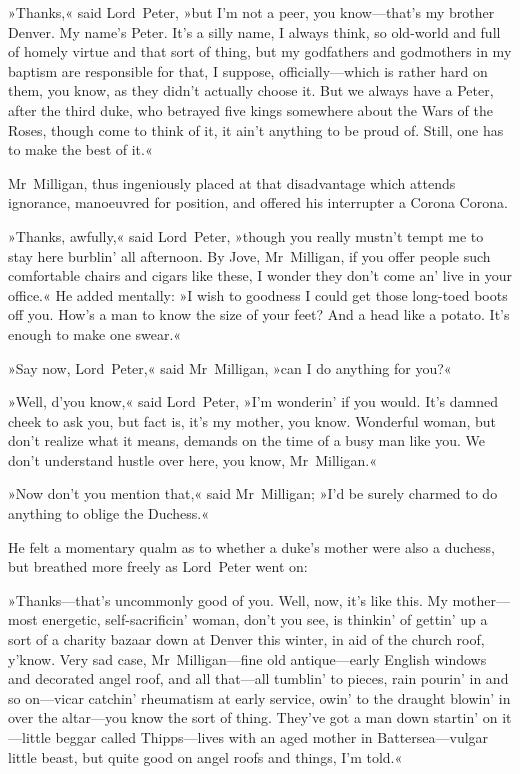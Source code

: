 »Thanks,« said Lord~Peter, »but I'm not a peer, you know—that's my brother Denver. My name's Peter. It's a silly name, I always think, so old-world and full of homely virtue and that sort of thing, but my godfathers and godmothers in my baptism are responsible for that, I suppose, officially—which is rather hard on them, you know, as they didn't actually choose it. But we always have a Peter, after the third duke, who betrayed five kings somewhere about the Wars of the Roses, though come to think of it, it ain't anything to be proud of. Still, one has to make the best of it.«

Mr~Milligan, thus ingeniously placed at that disadvantage which attends ignorance, manoeuvred for position, and offered his interrupter a Corona Corona.

»Thanks, awfully,« said Lord~Peter, »though you really mustn't tempt me to stay here burblin' all afternoon. By Jove, Mr~Milligan, if you offer people such comfortable chairs and cigars like these, I wonder they don't come an' live in your office.« He added mentally: »I wish to goodness I could get those long-toed boots off you. How's a man to know the size of your feet? And a head like a potato. It's enough to make one swear.«

»Say now, Lord~Peter,« said Mr~Milligan, »can I do anything for you?«

»Well, d'you know,« said Lord~Peter, »I'm wonderin' if you would. It's damned cheek to ask you, but fact is, it's my mother, you know. Wonderful woman, but don't realize what it means, demands on the time of a busy man like you. We don't understand hustle over here, you know, Mr~Milligan.«

»Now don't you mention that,« said Mr~Milligan; »I'd be surely charmed to do anything to oblige the Duchess.«

He felt a momentary qualm as to whether a duke's mother were also a duchess, but breathed more freely as Lord~Peter went on:

»Thanks—that's uncommonly good of you. Well, now, it's like this. My mother—most energetic, self-sacrificin' woman, don't you see, is thinkin' of gettin' up a sort of a charity bazaar down at Denver this winter, in aid of the church roof, y'know. Very sad case, Mr~Milligan—fine old antique—early English windows and decorated angel roof, and all that—all tumblin' to pieces, rain pourin' in and so on—vicar catchin' rheumatism at early service, owin' to the draught blowin' in over the altar—you know the sort of thing. They've got a man down startin' on it—little beggar called Thipps—lives with an aged mother in Battersea—vulgar little beast, but quite good on angel roofs and things, I'm told.«

